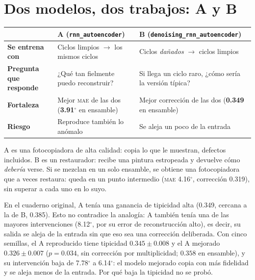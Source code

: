 \documentclass[11pt,a4paper]{article}
\newcommand{\gr}{$^\circ$}
\newcommand{\mae}{\textsc{mae}}
\begin{document}
\section{Dos modelos, dos trabajos: A y B}
\label{sec:ab}

\begin{tabularx}{\textwidth}{@{}>{\bfseries}p{3.0cm}XX@{}}
\toprule
 & \textbf{A} (\texttt{rnn\_autoencoder}) & \textbf{B} (\texttt{denoising\_rnn\_autoencoder}) \\
\midrule
Se entrena con & Ciclos limpios $\to$ los mismos ciclos & Ciclos \emph{dañados} $\to$ ciclos limpios \\
Pregunta que responde & ¿Qué tan fielmente puedo reconstruir? & Si llega un ciclo raro, ¿cómo sería la versión típica? \\
Fortaleza & Mejor \mae{} de las dos (\textbf{3.91\gr{}} en ensamble) & Mejor corrección de las dos (\textbf{0.349} en ensamble) \\
Riesgo & Reproduce también lo anómalo & Se aleja un poco de la entrada \\
\bottomrule
\end{tabularx}

\begin{intuicion}[Analogía]
A es una fotocopiadora de alta calidad: copia lo que le muestran, defectos incluidos. B es un restaurador: recibe una pintura estropeada y devuelve cómo \emph{debería} verse. Si se mezclan en un solo ensamble, se obtiene una fotocopiadora que a veces restaura: queda en un punto intermedio (\mae{} 4.16\gr, corrección 0.319), sin superar a cada uno en lo suyo.
\end{intuicion}

\begin{cuidado}
En el cuaderno original, A tenía una ganancia de tipicidad alta (0.349, cercana a la de B, 0.385). Esto no contradice la analogía: A también tenía una de las mayores intervenciones (8.12\gr, por su error de reconstrucción alto), es decir, su salida se aleja de la entrada sin que eso sea una corrección deliberada. Con cinco semillas, el A reproducido tiene tipicidad $0.345\pm0.008$ y el A mejorado $0.326\pm0.007$ ($p=0.034$, sin corrección por multiplicidad; $0.358$ en ensamble), y su intervención baja de 7.78\gr{} a 6.14\gr: el modelo mejorado copia con más fidelidad y se aleja menos de la entrada. Por qué baja la tipicidad no se probó.
\end{cuidado}
\end{document}
